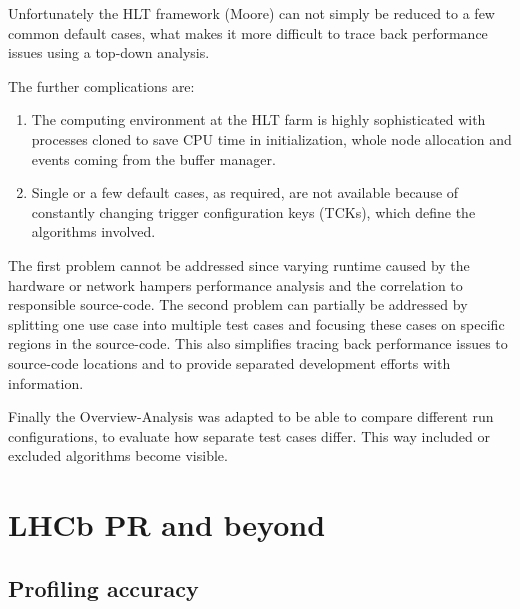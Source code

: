 \documentclass[a4paper]{jpconf}
\begin{document}
Unfortunately the HLT framework (Moore) can not simply be reduced to a few common default cases, what makes it more difficult to trace back performance issues using a top-down analysis.

The further complications are:
\begin{enumerate}
 \item The computing environment at the HLT farm is highly sophisticated with processes cloned to save CPU time in initialization, whole node allocation and events coming from the buffer manager.
 \item Single or a few default cases, as required, are not available because of constantly changing trigger configuration keys (TCKs), which define the algorithms involved.
\end{enumerate}

The first problem cannot be addressed since varying runtime caused by the hardware or network hampers performance analysis and the correlation to responsible source-code. The second problem can partially be addressed by splitting one use case into multiple test cases and focusing these cases on specific regions in the source-code. This also simplifies tracing back performance issues to source-code locations and to provide separated development efforts with information.

Finally the Overview-Analysis was adapted to be able to compare different run configurations, to evaluate how separate test cases differ. This way included or excluded algorithms become visible.

\section{LHCb PR and beyond}
\label{sec:lhcbpr_and_beyond}

\subsection{Profiling accuracy}
\label{sec:profiling accuracy}
\end{document}
